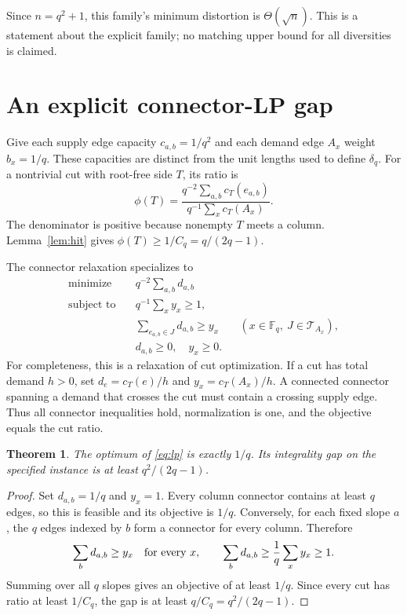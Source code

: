 \documentclass[11pt]{article}
\newtheorem{theorem}{Theorem}
\newcommand{\F}{\mathbb F}
\begin{document}
Since $n=q^2+1$, this family's minimum distortion is $\Theta(\sqrt n)$.
This is a statement about the explicit family; no matching upper bound
for all diversities is claimed.

\section{An explicit connector-LP gap}
Give each supply edge capacity $c_{a,b}=1/q^2$ and each demand edge $A_x$
weight $b_x=1/q$. These capacities are distinct from the unit lengths used
to define $\delta_q$. For a nontrivial cut with root-free side $T$, its ratio is
\[
 \phi(T)=\frac{q^{-2}\sum_{a,b}c_T(e_{a,b})}
                   {q^{-1}\sum_x c_T(A_x)}.
\]
The denominator is positive because nonempty $T$ meets a column.
Lemma~\ref{lem:hit} gives $\phi(T)\ge1/C_q=q/(2q-1)$.

The connector relaxation \cite[Equation (24)]{JS} specializes to
\begin{equation}\label{eq:lp}
\begin{aligned}
 \text{minimize}\quad &q^{-2}\sum_{a,b}d_{a,b}\\
 \text{subject to}\quad &q^{-1}\sum_x y_x\ge1,\\
 &\sum_{e_{a,b}\in J}d_{a,b}\ge y_x
       &&(x\in\F_q,\ J\in\mathcal T_{A_x}),\\
 &d_{a,b}\ge0,\quad y_x\ge0.
\end{aligned}
\end{equation}
For completeness, this is a relaxation of cut optimization. If a cut has
total demand $h>0$, set $d_e=c_T(e)/h$ and $y_x=c_T(A_x)/h$.
A connected connector spanning a demand that crosses the cut must contain
a crossing supply edge. Thus all connector inequalities hold, normalization
is one, and the objective equals the cut ratio.

\begin{theorem}
The optimum of \eqref{eq:lp} is exactly $1/q$. Its integrality gap on the
specified instance is at least $q^2/(2q-1)$.
\end{theorem}
\begin{proof}
Set $d_{a,b}=1/q$ and $y_x=1$. Every column connector contains at least
$q$ edges, so this is feasible and its objective is $1/q$.
Conversely, for each fixed slope $a$, the $q$ edges indexed by $b$ form
a connector for every column. Therefore
\[
 \sum_b d_{a,b}\ge y_x\quad\hbox{for every }x,
 \qquad \sum_b d_{a,b}\ge\frac1q\sum_x y_x\ge1.
\]
Summing over all $q$ slopes gives an objective of at least $1/q$.
Since every cut has ratio at least $1/C_q$, the gap is at least
$q/C_q=q^2/(2q-1)$.
\end{proof}
\end{document}
